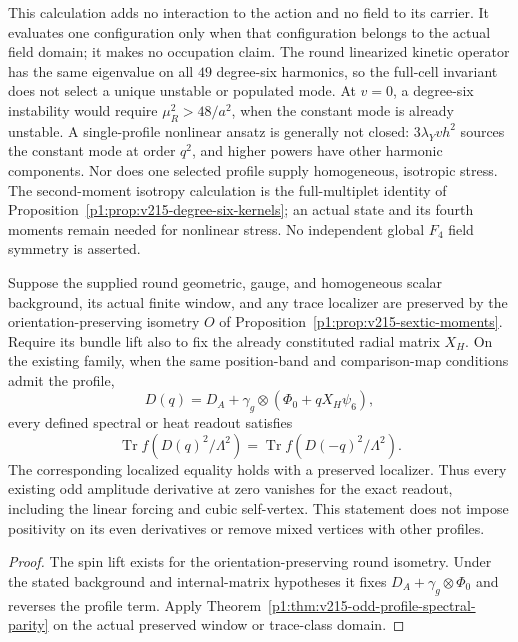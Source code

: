 \documentclass[12pt,a4paper]{article}
\begin{document}
\begin{remark}
This calculation adds no interaction to the action and no field to its
carrier. It evaluates one configuration only when that configuration
belongs to the actual field domain; it makes no occupation claim. The
round linearized kinetic operator has the same eigenvalue on all
\(49\) degree-six harmonics, so the full-cell invariant does not select
a unique unstable or populated mode. At \(v=0\), a degree-six
instability would require \(\mu_R^2>48/a^2\), when the constant mode
is already unstable. A single-profile nonlinear ansatz is generally
not closed: \(3\lambda_Yv h^2\) sources the constant mode at order
\(q^2\), and higher powers have other harmonic components. Nor does
one selected profile supply homogeneous, isotropic stress. The
second-moment isotropy calculation is the full-multiplet identity of
Proposition~\ref{p1:prop:v215-degree-six-kernels}; an actual state and
its fourth moments remain needed for nonlinear stress. No independent
global \(F_4\) field symmetry is asserted.
\end{remark}

\begin{corollary}
\label{p3f:cor:v215-sextic-heat-parity}
Suppose the supplied round geometric, gauge, and homogeneous scalar
background, its actual finite window, and any trace localizer are
preserved by the orientation-preserving isometry \(O\) of
Proposition~\ref{p1:prop:v215-sextic-moments}. Require its bundle lift
also to fix the already constituted radial matrix \(X_H\). On the
existing family, when the same position-band and comparison-map
conditions admit the profile,
\[
 D(q)=D_A+\gamma_g\otimes(\Phi_0+qX_H\psi_6),
\]
every defined spectral or heat readout satisfies
\[
 \operatorname{Tr}f(D(q)^2/\Lambda^2)
          =\operatorname{Tr}f(D(-q)^2/\Lambda^2).
\]
The corresponding localized equality holds with a preserved localizer.
Thus every existing odd amplitude derivative at zero vanishes for the
exact readout, including the linear forcing and cubic self-vertex.
This statement does not impose positivity on its even derivatives or
remove mixed vertices with other profiles.
\end{corollary}
\begin{proof}
The spin lift exists for the orientation-preserving round isometry.
Under the stated background and internal-matrix hypotheses it fixes
\(D_A+\gamma_g\otimes\Phi_0\) and reverses the profile term.
Apply Theorem~\ref{p1:thm:v215-odd-profile-spectral-parity} on the
actual preserved window or trace-class domain.
\end{proof}
\end{document}
